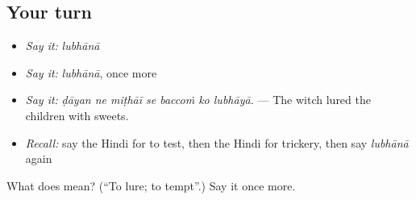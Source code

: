 \subsection*{Your turn}
\begin{itemize}
\raggedright
  \item \emph{Say it:} \emph{lubhānā}
  \item \emph{Say it:} \emph{lubhānā}, once more
  \item \emph{Say it:} \emph{ḍāyan ne miṭhāī se baccoṁ ko lubhāyā.} — The witch lured the children with sweets.
  \item \emph{Recall:} say the Hindi for to test, then the Hindi for trickery, then say \emph{lubhānā} again
\end{itemize}

\begin{tcolorbox}[breakable,colback=teal!4,colframe=teal!35!black,title={Before you move on}]
What does  mean? (\textquotedblleft{}To lure; to tempt\textquotedblright{}.) Say it once more.
\end{tcolorbox}
